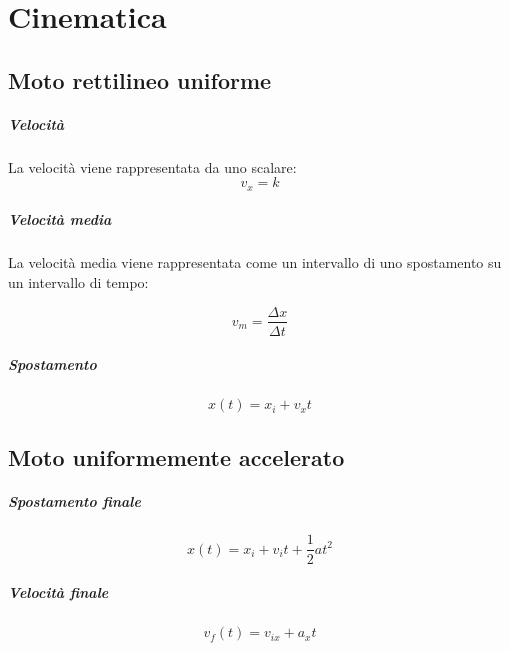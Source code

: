 \chapter{Cinematica}

    \section{Moto rettilineo uniforme}

        \paragraph{Velocità} 
            La velocità viene rappresentata da uno scalare:
            \begin{equation}
                v_x = k
            \end{equation}

        \paragraph{Velocità media} 
            La velocità media viene rappresentata come un intervallo di uno 
            spostamento su un intervallo di tempo:

            \begin{equation}
                v_m = \frac{\Delta x}{\Delta t}
            \end{equation}

        \paragraph{Spostamento}
            \begin{equation}
                x(t) = x_i + v_xt
            \end{equation}

    \section{Moto uniformemente accelerato}

        \paragraph{Spostamento finale}
            \begin{equation}
                x(t) = x_i + v_it + \frac{1}{2}at^2
            \end{equation}

        \paragraph{Velocità finale}
            \begin{equation}
                v_f(t) = v_{ix} + a_xt
            \end{equation}

